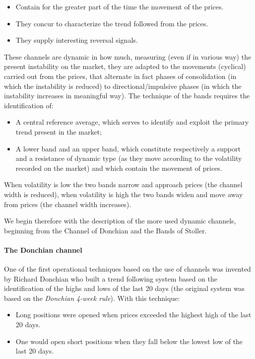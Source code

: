 \begin{itemize}
\setlength\itemsep{0.3em}
\item Contain for the greater part of the time the movement of the prices.
\item They concur to characterize the trend followed from the prices.
\item They supply interesting reversal signals.
\end{itemize}

These channels are dynamic in how much, measuring (even if in various way) the present instability on the market, they are adapted to the movements (cyclical) carried out from the prices, that alternate in fact phases of consolidation (in which the instability is reduced) to directional/impulsive phases (in which the instability increases in meaningful way). The technique of the bands requires the identification of:

\begin{itemize}
\setlength\itemsep{0.3em}
\item A central reference average, which serves to identify and exploit the primary trend present in the market;
\item A lower band and an upper band, which constitute respectively a support and a resistance of dynamic type (as they move according to the volatility recorded on the market) and which contain the movement of prices.
\end{itemize}

When volatility is low the two bands narrow and approach prices (the channel width is reduced), when volatility is high the two bands widen and move away from prices (the channel width increases). 

We begin therefore with the description of the more used dynamic channels, beginning from the Channel of Donchian and the Bands of Stoller. 

\paragraph{\textbf{The Donchian channel}}\mbox{}

One of the first operational techniques based on the use of channels was invented by Richard Donchian who built a trend following system based on the identification of the highs and lows of the last 20 days (the original system was based on the \textit{Donchian 4-week rule}). With this technique:

\begin{itemize}
\setlength\itemsep{0.3em}
\item Long positions were opened when prices exceeded the highest high of the last 20 days.
\item One would open short positions when they fall below the lowest low of the last 20 days.
\end{itemize}  

